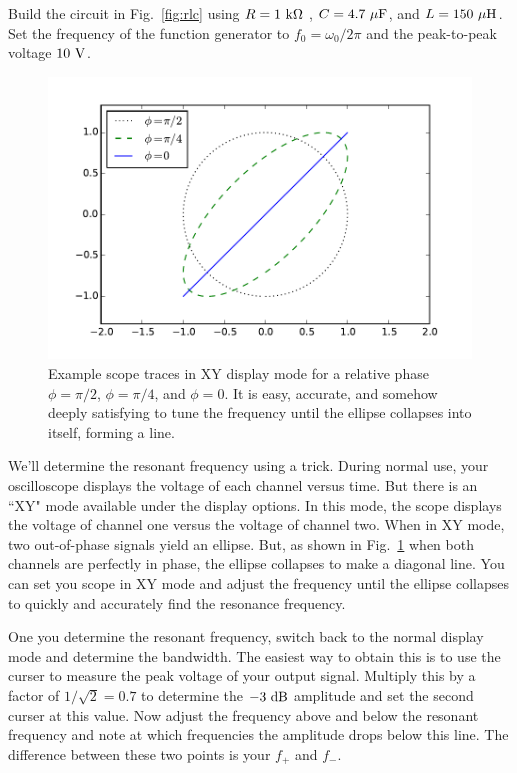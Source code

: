 Build the circuit in Fig.~\ref{fig:rlc} using $R=1~{\rm k \Omega}$ , $C=4.7~\rm{\mu F}$, and $L=150~\rm \mu H$.
Set the frequency of the function generator to $f_0 = \omega_0/2\pi$  and the peak-to-peak voltage $10~\rm V$.

\begin{figure}[htbp]
\begin{center}
\includegraphics[height=0.35\textheight]{figs/labs/filters/scope_xy.pdf}
\end{center}
\caption{\label{fig:scopexy} Example scope traces in XY display mode for a relative phase $\phi=\pi/2$, 
$\phi=\pi/4$, and $\phi=0$.  It is easy, accurate, and somehow deeply satisfying to tune the frequency until the ellipse collapses into itself, forming a line.}
\end{figure}

We'll determine the resonant frequency using a trick.  During normal use, your oscilloscope displays the voltage of each channel versus time.  But there is an ``XY" mode available under the display options.  In this mode, the scope displays the voltage of channel one versus the voltage of channel two.  When in XY mode, two out-of-phase signals yield an ellipse.  But, as shown in Fig.~\ref{fig:scopexy} when both channels are perfectly in phase, the ellipse collapses to make a diagonal line.  You can set you scope in XY mode and adjust the frequency until the ellipse collapses to quickly and accurately find the resonance frequency.

One you determine the resonant frequency, switch back to the normal display mode and determine the bandwidth.  The easiest way to obtain this is to use the curser to measure the peak voltage of your output signal.  Multiply this by a factor of $1/\sqrt{2} = 0.7$ to determine the $-3~\rm dB$ amplitude and set the second curser at this value.  Now adjust the frequency above and below the resonant frequency and note at which frequencies the amplitude drops below this line.  The difference between these two points is your $f_+$ and $f_-$.

